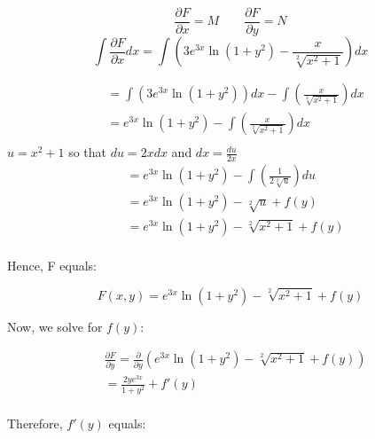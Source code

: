 \documentclass{article}
\begin{document}
    \begin{equation}
        \frac{\partial F}{\partial x} = M 
        \qquad
        \frac{\partial F}{\partial y} = N
    \end{equation} 
    \begin{equation}
            \int \frac{\partial F}{\partial x}dx 
            = 
            \int \left( 3e^{3x}\ln{(1+y^{2})}-\frac{x}{\sqrt[2]{x^{2}+1}} \right)dx
    \end{equation}
    \newpage
    \begin{singlespace}
        \begin{align*}
            &= \int \left(3e^{3x}\ln(1+y^{2})\right)dx  - \int \left(\frac{x}{\sqrt[2]{x^{2}+1}}\right)dx \\
            &= e^{3x}\ln(1+y^{2}) - \int \left(\frac{x}{\sqrt[2]{x^{2}+1}}\right)dx \\
        \end{align*}
        $u=x^{2}+1$ so that $du=2xdx$ and $dx=\frac{du}{2x}$
        \begin{align*}
            &= e^{3x}\ln(1+y^{2}) - \int \left(\frac{1}{2\sqrt[2]{u}}\right)du \\
            &= e^{3x}\ln(1+y^{2}) - \sqrt[2]{u} + f(y) \\
            &= e^{3x}\ln(1+y^{2}) - \sqrt[2]{x^{2}+1} + f(y) \\
        \end{align*}
        \begin{flushleft}
            Hence, F equals:
        \end{flushleft}
        \begin{equation}
            F(x, y) = e^{3x}\ln(1+y^{2}) - \sqrt[2]{x^{2}+1} + f(y)
        \end{equation}
        \begin{flushleft}
            Now, we solve for $f(y)$:
        \end{flushleft}
        \begin{align*}
            &\frac{\partial{F}}{\partial{y}} 
            = \frac{\partial{}}{\partial{y}}\left( e^{3x}\ln(1+y^{2}) - \sqrt[2]{x^{2}+1} + f(y) \right) \\
            &= \frac{2ye^{3x}}{1+y^{2}} + f'(y) \\
        \end{align*}
        \begin{flushleft}
            Therefore, $f'(y)$ equals:
        \end{flushleft}
        \begin{align*}

\end{align*}
\end{singlespace}
\end{document}
